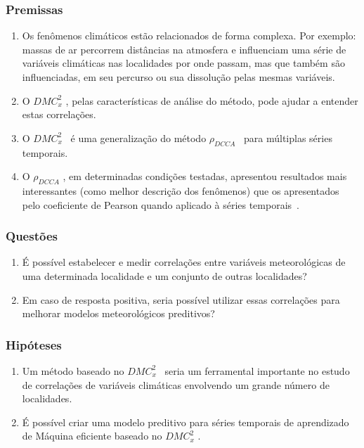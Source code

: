 \documentclass[10pt]{beamer}
\newcommand{\dmc}{\(DMC_x^2\) }
\newcommand{\pdcca}{\({\rho}_{DCCA}\) }
\begin{document}
\begin{frame}
  \frametitle{Premissas}

  \begin{enumerate}
    \label{enum:premissas}
    \item Os fenômenos climáticos estão relacionados de forma complexa. Por exemplo: massas de ar percorrem distâncias na atmosfera e influenciam uma série de variáveis climáticas nas localidades por onde passam, mas que também são influenciadas, em seu percurso ou sua dissolução pelas mesmas variáveis.
    \item O \dmc, pelas características de análise do método, pode ajudar a entender estas correlações.
    \item O \dmc~é uma generalização do método \pdcca~para múltiplas séries temporais.
	\item O \pdcca, em determinadas condições testadas, apresentou resultados mais interessantes (como melhor descrição dos fenômenos) que os apresentados pelo coeficiente de Pearson quando aplicado à séries temporais~\cite{Wang2013}. 
\end{enumerate}

\end{frame}

\begin{frame}
  \frametitle{Questões}

  \begin{enumerate}
    \label{enum:quest}

    \item É possível estabelecer e medir correlações entre variáveis meteorológicas de uma determinada localidade e um conjunto de outras localidades?

    \item Em caso de resposta positiva, seria possível utilizar essas correlações para melhorar modelos meteorológicos preditivos?
\end{enumerate}

\end{frame}

\begin{frame}
  \frametitle{Hipóteses}

  \begin{enumerate}
    \item Um método baseado no \dmc~seria um ferramental importante no estudo de correlações de variáveis climáticas envolvendo um grande número de localidades.
	\item É possível criar uma modelo preditivo para séries temporais de aprendizado de Máquina eficiente baseado no \dmc.
\end{enumerate}

\end{frame}
\end{document}

